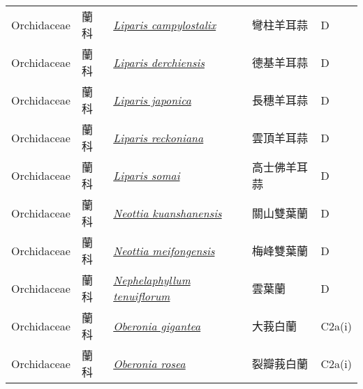 {\begin{longtable}{p{2.5cm}p{2.5cm}p{4.5cm}p{2.5cm}p{3cm}}
    Orchidaceae & 蘭科 & \href{http://www.theplantlist.org/tpl1.1/search?q=Liparis+campylostalix}{\textit{Liparis campylostalix} } & 彎柱羊耳蒜 & D \index{Liparis@\textit{Liparis}!campylostalix@\textit{campylostalix}}  \index{彎柱羊耳蒜} \\
    Orchidaceae & 蘭科 & \href{http://www.theplantlist.org/tpl1.1/search?q=Liparis+derchiensis}{\textit{Liparis derchiensis} } & 德基羊耳蒜 & D \index{Liparis@\textit{Liparis}!derchiensis@\textit{derchiensis}}  \index{德基羊耳蒜} \\
    Orchidaceae & 蘭科 & \href{http://www.theplantlist.org/tpl1.1/search?q=Liparis+japonica}{\textit{Liparis japonica} } & 長穗羊耳蒜 & D \index{Liparis@\textit{Liparis}!japonica@\textit{japonica}}  \index{長穗羊耳蒜} \\
    Orchidaceae & 蘭科 & \href{http://www.theplantlist.org/tpl1.1/search?q=Liparis+reckoniana}{\textit{Liparis reckoniana} } & 雲頂羊耳蒜 & D \index{Liparis@\textit{Liparis}!reckoniana@\textit{reckoniana}}  \index{雲頂羊耳蒜} \\
    Orchidaceae & 蘭科 & \href{http://www.theplantlist.org/tpl1.1/search?q=Liparis+somai}{\textit{Liparis somai} } & 高士佛羊耳蒜 & D \index{Liparis@\textit{Liparis}!somai@\textit{somai}}  \index{高士佛羊耳蒜} \\
    Orchidaceae & 蘭科 & \href{http://www.theplantlist.org/tpl1.1/search?q=Neottia+kuanshanensis}{\textit{Neottia kuanshanensis} } & 關山雙葉蘭 & D \index{Neottia@\textit{Neottia}!kuanshanensis@\textit{kuanshanensis}}  \index{關山雙葉蘭} \\
    Orchidaceae & 蘭科 & \href{http://www.theplantlist.org/tpl1.1/search?q=Neottia+meifongensis}{\textit{Neottia meifongensis} } & 梅峰雙葉蘭 & D \index{Neottia@\textit{Neottia}!meifongensis@\textit{meifongensis}}  \index{梅峰雙葉蘭} \\
    Orchidaceae & 蘭科 & \href{http://www.theplantlist.org/tpl1.1/search?q=Nephelaphyllum+tenuiflorum}{\textit{Nephelaphyllum tenuiflorum} } & 雲葉蘭 & D \index{Nephelaphyllum@\textit{Nephelaphyllum}!tenuiflorum@\textit{tenuiflorum}}  \index{雲葉蘭} \\
    Orchidaceae & 蘭科 & \href{http://www.theplantlist.org/tpl1.1/search?q=Oberonia+gigantea}{\textit{Oberonia gigantea} } & 大莪白蘭 & C2a(i) \index{Oberonia@\textit{Oberonia}!gigantea@\textit{gigantea}}  \index{大莪白蘭} \\
    Orchidaceae & 蘭科 & \href{http://www.theplantlist.org/tpl1.1/search?q=Oberonia+rosea}{\textit{Oberonia rosea} } & 裂瓣莪白蘭 & C2a(i) \index{Oberonia@\textit{Oberonia}!rosea@\textit{rosea}}  \index{裂瓣莪白蘭} \\

\end{longtable}}
